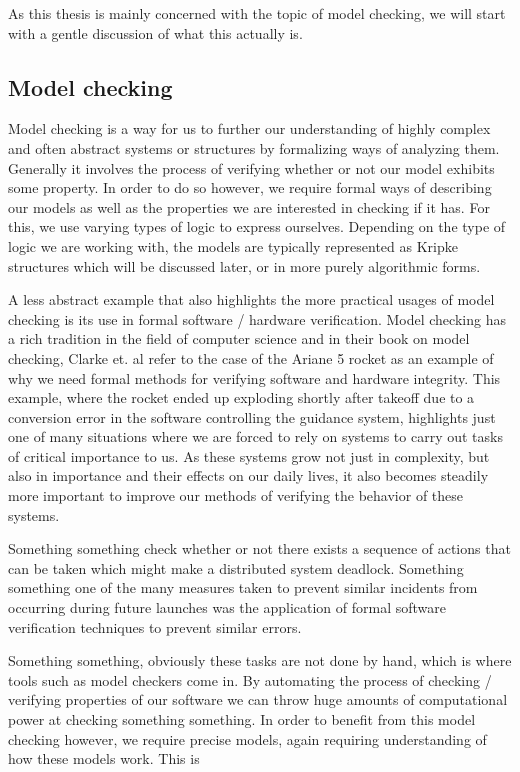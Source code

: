 As this thesis is mainly concerned with the topic of model checking, we will start with a gentle discussion of what this actually is. 

\subsection{Model checking}

Model checking is a way for us to further our understanding of highly complex and often abstract systems or structures by formalizing ways of analyzing them. Generally it involves the process of verifying whether or not our model exhibits some property. In order to do so however, we require formal ways of describing our models as well as the properties we are interested in checking if it has. For this, we use varying types of logic to express ourselves. Depending on the type of logic we are working with, the models are typically represented as Kripke structures which will be discussed later, or in more purely algorithmic forms.

A less abstract example that also highlights the more practical usages of model checking is its use in formal software / hardware verification. Model checking has a rich tradition in the field of computer science and 
in their book on model checking, Clarke et. al \cite{Clarke1999} refer to the case of the Ariane 5 rocket as an example of why we need formal methods for verifying software and hardware integrity. This example, where the rocket ended up exploding shortly after takeoff due to a conversion error in the software controlling the guidance system, highlights just one of many situations where we are forced to rely on systems to carry out tasks of critical importance to us. As these systems grow not just in complexity, but also in importance and their effects on our daily lives, it also becomes steadily more important to improve our methods of verifying the behavior of these systems. 

Something something check whether or not there exists a sequence of actions that can be taken which might make a distributed system deadlock. 
Something something one of the many measures taken to prevent similar incidents from occurring during future launches was the application of formal software verification techniques to prevent similar errors.

Something something, obviously these tasks are not done by hand, which is where tools such as model checkers come in. By automating the process of checking / verifying properties of our software we can throw huge amounts of computational power at checking something something. In order to benefit from this model checking however, we require precise models, again requiring understanding of how these models work. This is 

